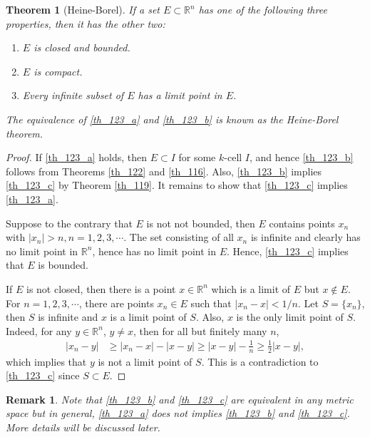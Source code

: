 \documentclass[10pt]{book}
\newtheorem{theorem}{Theorem}[chapter]
\newtheorem{remark}{Remark}[chapter]
\theoremstyle{definition}
\numberwithin{equation}{chapter}
\begin{document}
\medskip

\begin{theorem}[Heine-Borel]\label{th_123}
If a set $E \subset \mathbb{R}^n$ has one of the following three properties, then it has the other two:
\begin{enumerate}[label=(\alph*)]
    \item $E$ is closed and bounded. \label{th_123_a}
    
    \item $E$ is compact. \label{th_123_b}
    
    \item Every infinite subset of $E$ has a limit point in $E$. \label{th_123_c}
\end{enumerate}
The equivalence of \ref{th_123_a} and \ref{th_123_b} is known as the Heine-Borel theorem.
\end{theorem}
\begin{proof}
If \ref{th_123_a} holds, then $E \subset I$ for some $k$-cell $I$, and hence \ref{th_123_b} follows from Theorems \ref{th_122} and \ref{th_116}. Also, \ref{th_123_b} implies \ref{th_123_c} by Theorem \ref{th_119}. It remains to show that \ref{th_123_c} implies \ref{th_123_a}.

Suppose to the contrary that $E$ is not not bounded, then $E$ contains points $x_n$ with $\left|x_n\right| > n, n = 1,2,3,\cdots$. The set consisting of all $x_n$ is infinite and clearly has no limit point in $\mathbb{R}^n$, hence has no limit point in $E$. Hence, \ref{th_123_c} implies that $E$ is bounded.

If $E$ is not closed, then there is a point $x \in \mathbb{R}^n$ which is a limit of $E$ but $x \notin E$. For $n = 1,2,3,\cdots$, there are points $x_n \in E$ such that $\left|x_n - x\right| < 1/n$. Let $S = \{x_n\}$, then $S$ is infinite and $x$ is a limit point of $S$. Also, $x$ is the only limit point of $S$. Indeed, for any $y \in \mathbb{R}^n$, $y \neq x$, then for all but finitely many $n$,
\begin{align*}
    \left|x_n - y\right| & \geq \left|x_n - x\right| - \left|x - y\right| \geq \left|x - y\right| - \frac{1}{n} \geq \frac{1}{2} \left|x - y\right|,
\end{align*}
which implies that $y$ is not a limit point of $S$. This is a contradiction to \ref{th_123_c} since $S \subset E$.
\end{proof}

\begin{remark}
Note that \ref{th_123_b} and \ref{th_123_c} are equivalent in any metric space but in general, \ref{th_123_a} does not implies \ref{th_123_b} and \ref{th_123_c}. More details will be discussed later.
\end{remark}
\end{document}
